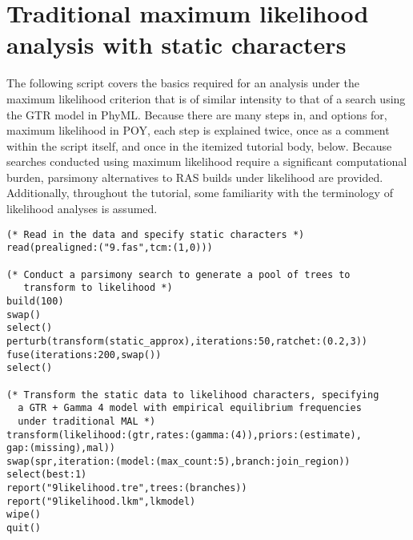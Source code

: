 \section{Traditional maximum likelihood analysis with static characters}{\label{tutorial10}}
The following script covers the basics required for an analysis under the maximum likelihood criterion that is of 
similar intensity to that of a search using the GTR model in PhyML. Because there are many steps in, and 
options for, maximum likelihood in POY, each step is explained twice, once as a comment within the script itself, 
and once in the itemized tutorial body, below. Because searches conducted using maximum likelihood require a 
significant computational burden, parsimony alternatives to RAS builds under likelihood are provided. Additionally, 
throughout the tutorial, some familiarity with the terminology of likelihood analyses is assumed.

\begin{verbatim}
(* Read in the data and specify static characters *)
read(prealigned:("9.fas",tcm:(1,0)))

(* Conduct a parsimony search to generate a pool of trees to 
   transform to likelihood *)
build(100)
swap()
select()
perturb(transform(static_approx),iterations:50,ratchet:(0.2,3))
fuse(iterations:200,swap())
select()

(* Transform the static data to likelihood characters, specifying 
  a GTR + Gamma 4 model with empirical equilibrium frequencies 
  under traditional MAL *)
transform(likelihood:(gtr,rates:(gamma:(4)),priors:(estimate),
gap:(missing),mal))
swap(spr,iteration:(model:(max_count:5),branch:join_region))
select(best:1)
report("9likelihood.tre",trees:(branches))
report("9likelihood.lkm",lkmodel)
wipe()
quit()
\end{verbatim}

